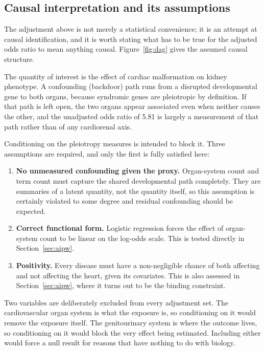 \documentclass[11pt,a4paper]{article}
\begin{document}
\subsection{Causal interpretation and its assumptions}
\label{sec:causal}

The adjustment above is not merely a statistical convenience; it is an attempt at causal
identification, and it is worth stating what has to be true for the adjusted odds ratio to
mean anything causal. Figure~\ref{fig:dag} gives the assumed causal structure.

The quantity of interest is the effect of cardiac malformation on kidney phenotype. A
confounding (backdoor) path runs from a disrupted developmental gene to both organs, because
syndromic genes are pleiotropic by definition. If that path is left open, the two organs
appear associated even when neither causes the other, and the unadjusted odds ratio of 5.81
is largely a measurement of that path rather than of any cardiorenal axis.

Conditioning on the pleiotropy measures is intended to block it. Three assumptions are
required, and only the first is fully satisfied here:

\begin{enumerate}
\item \textbf{No unmeasured confounding given the proxy.} Organ-system count and term count
must capture the shared developmental path completely. They are summaries of a latent
quantity, not the quantity itself, so this assumption is certainly violated to some degree
and residual confounding should be expected.
\item \textbf{Correct functional form.} Logistic regression forces the effect of
organ-system count to be linear on the log-odds scale. This is tested directly in
Section~\ref{sec:aipw}.
\item \textbf{Positivity.} Every disease must have a non-negligible chance of both affecting
and not affecting the heart, given its covariates. This is also assessed in
Section~\ref{sec:aipw}, where it turns out to be the binding constraint.
\end{enumerate}

Two variables are deliberately excluded from every adjustment set. The cardiovascular organ
system is what the exposure is, so conditioning on it would remove the exposure itself. The
genitourinary system is where the outcome lives, so conditioning on it would block the very
effect being estimated. Including either would force a null result for reasons that have
nothing to do with biology.
\end{document}
